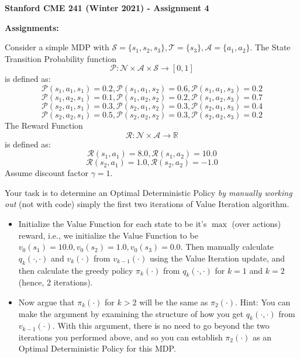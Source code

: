 \documentclass[12pt]{exam}
\begin{document}
\begin{center}
{\large {\bf Stanford CME 241 (Winter 2021) - Assignment 4}}
\end{center}
 
{\large{\bf Assignments:}}
\begin{questions}
 Consider a simple MDP with $\mathcal{S} = \{s_1, s_2, s_3\}, \mathcal{T} =\{s_3\}, \mathcal{A} = \{a_1, a_2\}$. The State Transition Probability function
$$\mathcal{P}: \mathcal{N} \times \mathcal{A} \times \mathcal{S} \rightarrow [0, 1]$$
is defined as:
$$\mathcal{P}(s_1, a_1, s_1) = 0.2, \mathcal{P}(s_1, a_1, s_2) = 0.6, \mathcal{P}(s_1, a_1, s_3) = 0.2$$
$$\mathcal{P}(s_1, a_2, s_1) = 0.1, \mathcal{P}(s_1, a_2, s_2) = 0.2, \mathcal{P}(s_1, a_2, s_3) = 0.7$$
$$\mathcal{P}(s_2, a_1, s_1) = 0.3, \mathcal{P}(s_2, a_1, s_2) = 0.3, \mathcal{P}(s_2, a_1, s_3) = 0.4$$
$$\mathcal{P}(s_2, a_2, s_1) = 0.5, \mathcal{P}(s_2, a_2, s_2) = 0.3, \mathcal{P}(s_2, a_2, s_3) = 0.2$$
The Reward Function 
$$\mathcal{R}: \mathcal{N} \times \mathcal{A} \rightarrow \mathbb{R}$$
is defined as:
$$\mathcal{R}(s_1, a_1) = 8.0, \mathcal{R}(s_1, a_2) = 10.0$$
$$\mathcal{R}(s_2, a_1) = 1.0, \mathcal{R}(s_2, a_2) = -1.0$$
Assume discount factor $\gamma = 1$.

Your task is to determine an Optimal Deterministic Policy {\em by manually working out} (not with code) simply the first two iterations of Value Iteration algorithm. 

\begin{itemize}
\item Initialize the Value Function for each state to be it's $\max$ (over actions) reward, i.e., we initialize the Value Function to be $v_0(s_1) = 10.0, v_0(s_2) = 1.0, v_0(s_3) = 0.0$. Then manually calculate $q_k(\cdot, \cdot)$ and $v_k(\cdot)$ from $v_{k - 1}( \cdot)$ using the Value Iteration update, and then calculate the greedy policy $\pi_k(\cdot)$ from $q_k(\cdot, \cdot)$ for $k = 1$ and $k = 2$ (hence, 2 iterations).

\item Now argue that $\pi_k(\cdot)$ for $k > 2$ will be the same as $\pi_2(\cdot)$. Hint: You can make the argument by examining the structure of how you get $q_k(\cdot, \cdot)$ from $v_{k-1}(\cdot)$. With this argument, there is no need to go beyond the two iterations you performed above, and so you can establish $\pi_2(\cdot)$ as an Optimal Deterministic Policy for this MDP.
\end{itemize}



\end{questions}
\end{document}

